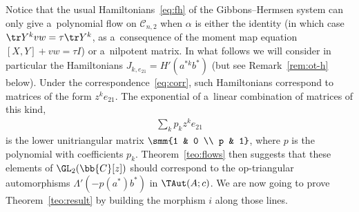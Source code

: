 Notice that the usual Hamiltonians~\eqref{eq:fh} of the Gibbons--Hermsen system can only give a~polynomial
f\/low on \(\mathcal{C}_{n,2}\) when \(\alpha\) is either the identity (in which case \(\tr Y^{k}vw = \tau
\tr Y^{k}\), as a~consequence of the moment map equation \([X,Y]+vw = \tau I\)) or a~nilpotent matrix.
In what follows we will consider in particular the Hamiltonians \(J_{k,e_{21}} = H'(a^{*k}b^{*})\) (but see
Remark~\ref{rem:ot-h} below).
Under the correspondence~\eqref{eq:corr}, such Hamiltonians correspond to matrices of the form
\(z^{k}e_{21}\).
The exponential of a~linear combination of matrices of this kind,
\begin{gather*}
\sum_{k}p_{k}z^{k}e_{21}
\end{gather*}
is the lower unitriangular matrix \(\smm{1 & 0
\\
p & 1}\), where \(p\) is the polynomial with coef\/f\/icients \(p_{k}\).
Theo\-rem~\ref{teo:flows} then suggests that these elements of \(\GL_{2}(\bb{C}[z])\) should correspond to
the op-triangular automorphisms \(\Lambda'(-p(a^{*})b^{*})\) in \(\TAut(A;c)\).
We are now going to prove Theorem~\ref{teo:result} by building the morphism \(i\) along those lines.


